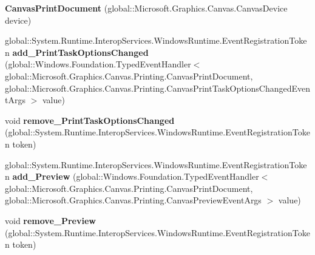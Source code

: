 \begin{DoxyCompactItemize}
\mbox{\label{class_microsoft_1_1_graphics_1_1_canvas_1_1_printing_1_1_canvas_print_document_a4e0992b6bdb01a46f6b04c52e8c394cb}} 
{\bfseries Canvas\+Print\+Document} (global\+::\+Microsoft.\+Graphics.\+Canvas.\+Canvas\+Device device)
\item 
\mbox{\label{class_microsoft_1_1_graphics_1_1_canvas_1_1_printing_1_1_canvas_print_document_a5820ace78b04e0ce349872d83c3d7006}} 
global\+::\+System.\+Runtime.\+Interop\+Services.\+Windows\+Runtime.\+Event\+Registration\+Token {\bfseries add\+\_\+\+Print\+Task\+Options\+Changed} (global\+::\+Windows.\+Foundation.\+Typed\+Event\+Handler$<$ global\+::\+Microsoft.\+Graphics.\+Canvas.\+Printing.\+Canvas\+Print\+Document, global\+::\+Microsoft.\+Graphics.\+Canvas.\+Printing.\+Canvas\+Print\+Task\+Options\+Changed\+Event\+Args $>$ value)
\item 
\mbox{\label{class_microsoft_1_1_graphics_1_1_canvas_1_1_printing_1_1_canvas_print_document_a0de28697a340eecb4f4b11addd897850}} 
void {\bfseries remove\+\_\+\+Print\+Task\+Options\+Changed} (global\+::\+System.\+Runtime.\+Interop\+Services.\+Windows\+Runtime.\+Event\+Registration\+Token token)
\item 
\mbox{\label{class_microsoft_1_1_graphics_1_1_canvas_1_1_printing_1_1_canvas_print_document_a27f47fca50c0e59ac08d765c11296386}} 
global\+::\+System.\+Runtime.\+Interop\+Services.\+Windows\+Runtime.\+Event\+Registration\+Token {\bfseries add\+\_\+\+Preview} (global\+::\+Windows.\+Foundation.\+Typed\+Event\+Handler$<$ global\+::\+Microsoft.\+Graphics.\+Canvas.\+Printing.\+Canvas\+Print\+Document, global\+::\+Microsoft.\+Graphics.\+Canvas.\+Printing.\+Canvas\+Preview\+Event\+Args $>$ value)
\item 
\mbox{\label{class_microsoft_1_1_graphics_1_1_canvas_1_1_printing_1_1_canvas_print_document_aa7beedc13a3a13307163655bbab18019}} 
void {\bfseries remove\+\_\+\+Preview} (global\+::\+System.\+Runtime.\+Interop\+Services.\+Windows\+Runtime.\+Event\+Registration\+Token token)

\end{DoxyCompactItemize}
